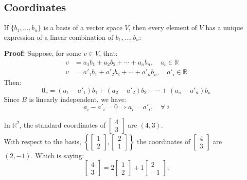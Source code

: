 \documentclass[a4paper, 9pt]{extarticle}
\begin{document}
\subsection{Coordinates}
\begin{lemmabox}{}{}
  If $\{b_1, \dots, b_n\}$ is a basis of a vector space $V$, then every element of $V$ has a unique expression of a linear combination of $b_1, \dots, b_n$:
\end{lemmabox}
\noindent\textbf{Proof:} Suppose, for some $v \in V$, that:
\begin{align*}
  v & = a_1 b_1 + a_2 b_2 + \cdots + a_n b_n,    \quad a_i \in \mathbb{R}     \\
  v & = a'_1 b_1 + a'_2 b_2 + \cdots + a'_n b_n,    \quad a'_i \in \mathbb{R}
\end{align*}
Then:
$$
  0_v = (a_1 - a'_1) b_1 + (a_2 - a'_2) b_2 + \cdots + (a_n - a'_n) b_n
$$
Since $B$ is linearly independent, we have:
$$a_i - a'_i = 0 \Longrightarrow a_i = a'_i ,\quad \forall \; i$$
\begin{examplebox}{}{}
  In $\mathbb{R}^2$, the standard coordinates of $\begin{bmatrix}4 \\3\end{bmatrix}$ are $(4,3)$. \\[2ex]
  With respect to the basis,
  $\left\{
    \begin{bmatrix}
      1 \\
      2
    \end{bmatrix},
    \begin{bmatrix}
      2 \\
      1
    \end{bmatrix}\right\}
  $ the coordinates of $\begin{bmatrix}4 \\3\end{bmatrix}$ are $(2, -1)$. Which is saying:
  $$
    \begin{bmatrix}
      4 \\
      3
    \end{bmatrix}
    =
    2
    \begin{bmatrix}
      1 \\
      2
    \end{bmatrix}
    +
    1
    \begin{bmatrix}
      2 \\
      -1
    \end{bmatrix}.
  $$


\end{examplebox}
\end{document}
